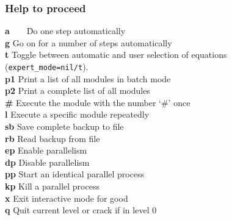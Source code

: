 \documentclass[12pt]{article}
\begin{document}
\subsubsection{Help to proceed}
\begin{tabbing}
  {\bf a}\ \ \ \ \= Do one step automatically      \\
  {\bf g}    \> Go on for a number of steps automatically    \\
  {\bf t}    \> Toggle between automatic and user selection of
                equations ({\tt expert\_mode=nil/t}).  \\
  {\bf p1}   \> Print a list of all modules in batch mode \\
  {\bf p2}   \> Print a complete list of all modules \\
  {\bf \#}   \> Execute the module with the number `\#' once  \\
  {\bf l}    \> Execute a specific module repeatedly         \\
  {\bf sb}   \> Save complete backup to file \\
  {\bf rb}   \> Read backup from file \\
  {\bf ep}   \> Enable parallelism \\
  {\bf dp}   \> Disable parallelism \\
  {\bf pp}   \> Start an identical parallel process \\
  {\bf kp}   \> Kill a parallel process \\
  {\bf x}    \> Exit interactive mode for good            \\
  {\bf q}    \> Quit current level or crack if in level 0
\end{tabbing}
\end{document}
